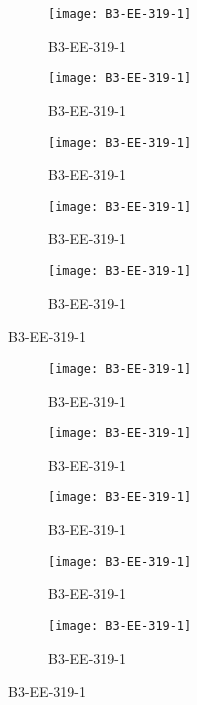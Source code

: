 \documentclass{article}
\begin{document}
\begin{figure}[]
	\centering
	\begin{subfigure}{0.19\textwidth}
		\centering
		\texttt{[image: B3-EE-319-1]}
		\caption*{\Large{B3-EE-319-1}}
	\end{subfigure}\hfil
	\begin{subfigure}{0.19\textwidth}
		\centering
		\texttt{[image: B3-EE-319-1]}
		\caption*{\Large{B3-EE-319-1}}
	\end{subfigure}\hfil
	\begin{subfigure}{0.19\textwidth}
		\centering
		\texttt{[image: B3-EE-319-1]}
		\caption*{\Large{B3-EE-319-1}}
	\end{subfigure}\hfil
	\begin{subfigure}{0.19\textwidth}
		\centering
		\texttt{[image: B3-EE-319-1]}
		\caption*{\Large{B3-EE-319-1}}
	\end{subfigure} \hfil
	\begin{subfigure}{0.19\textwidth}
		\centering
		\texttt{[image: B3-EE-319-1]}
		\caption*{\Large{B3-EE-319-1}}
	\end{subfigure}
\end{figure}

\begin{figure}[]
	\centering
	\begin{subfigure}{0.19\textwidth}
		\centering
		\texttt{[image: B3-EE-319-1]}
		\caption*{\Large{B3-EE-319-1}}
	\end{subfigure}\hfil
	\begin{subfigure}{0.19\textwidth}
		\centering
		\texttt{[image: B3-EE-319-1]}
		\caption*{\Large{B3-EE-319-1}}
	\end{subfigure}\hfil
	\begin{subfigure}{0.19\textwidth}
		\centering
		\texttt{[image: B3-EE-319-1]}
		\caption*{\Large{B3-EE-319-1}}
	\end{subfigure}\hfil
	\begin{subfigure}{0.19\textwidth}
		\centering
		\texttt{[image: B3-EE-319-1]}
		\caption*{\Large{B3-EE-319-1}}
	\end{subfigure} \hfil
	\begin{subfigure}{0.19\textwidth}
		\centering
		\texttt{[image: B3-EE-319-1]}
		\caption*{\Large{B3-EE-319-1}}
	\end{subfigure}
\end{figure}
\end{document}
